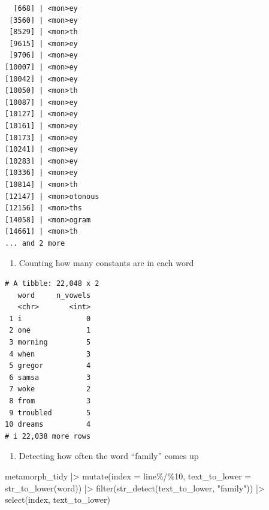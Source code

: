 \documentclass[
  letterpaper,
  DIV=11,
  numbers=noendperiod]{scrartcl}
\newenvironment{Shaded}{\begin{snugshade}}{\end{snugshade}}
\newcommand{\AttributeTok}[1]{\textcolor[rgb]{0.40,0.45,0.13}{#1}}
\newcommand{\DecValTok}[1]{\textcolor[rgb]{0.68,0.00,0.00}{#1}}
\newcommand{\FunctionTok}[1]{\textcolor[rgb]{0.28,0.35,0.67}{#1}}
\newcommand{\NormalTok}[1]{\textcolor[rgb]{0.00,0.23,0.31}{#1}}
\newcommand{\SpecialCharTok}[1]{\textcolor[rgb]{0.37,0.37,0.37}{#1}}
\newcommand{\StringTok}[1]{\textcolor[rgb]{0.13,0.47,0.30}{#1}}
\providecommand{\tightlist}{%
  \setlength{\itemsep}{0pt}\setlength{\parskip}{0pt}}\usepackage{longtable,booktabs,array}
\begin{document}
\begin{verbatim}
  [668] | <mon>ey
 [3560] | <mon>ey
 [8529] | <mon>th
 [9615] | <mon>ey
 [9706] | <mon>ey
[10007] | <mon>ey
[10042] | <mon>ey
[10050] | <mon>th
[10087] | <mon>ey
[10127] | <mon>ey
[10161] | <mon>ey
[10173] | <mon>ey
[10241] | <mon>ey
[10283] | <mon>ey
[10336] | <mon>ey
[10814] | <mon>th
[12147] | <mon>otonous
[12156] | <mon>ths
[14058] | <mon>ogram
[14661] | <mon>th
... and 2 more
\end{verbatim}

\begin{enumerate}
\def\labelenumi{\arabic{enumi}.}
\setcounter{enumi}{1}
\tightlist
\item
  Counting how many constants are in each word
\end{enumerate}

\begin{Shaded}
\end{Shaded}

\begin{verbatim}
# A tibble: 22,048 x 2
   word     n_vowels
   <chr>       <int>
 1 i               0
 2 one             1
 3 morning         5
 4 when            3
 5 gregor          4
 6 samsa           3
 7 woke            2
 8 from            3
 9 troubled        5
10 dreams          4
# i 22,038 more rows
\end{verbatim}

\begin{enumerate}
\def\labelenumi{\arabic{enumi}.}
\setcounter{enumi}{2}
\tightlist
\item
  Detecting how often the word ``family'' comes up
\end{enumerate}

\begin{Shaded}
\begin{Highlighting}[]
\NormalTok{metamorph\_tidy }\SpecialCharTok{|\textgreater{}}
  \FunctionTok{mutate}\NormalTok{(}\AttributeTok{index =}\NormalTok{ line}\SpecialCharTok{\%/\%}\DecValTok{10}\NormalTok{, }\AttributeTok{text\_to\_lower =} \FunctionTok{str\_to\_lower}\NormalTok{(word)) }\SpecialCharTok{|\textgreater{}}
  \FunctionTok{filter}\NormalTok{(}\FunctionTok{str\_detect}\NormalTok{(text\_to\_lower, }\StringTok{"family"}\NormalTok{)) }\SpecialCharTok{|\textgreater{}}
  \FunctionTok{select}\NormalTok{(index, text\_to\_lower) }
\end{Highlighting}
\end{Shaded}
\end{document}
